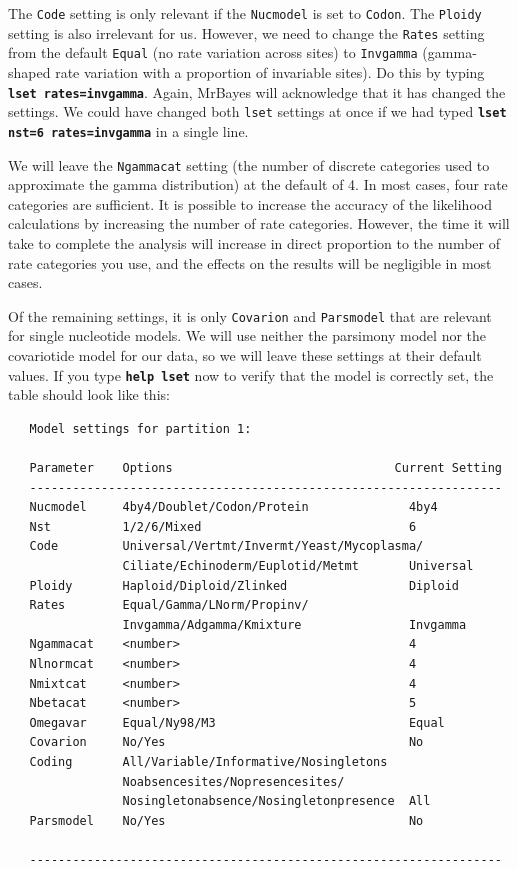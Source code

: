\documentclass[12pt]{book}
\newcommand{\ttt}[1]{\texttt{#1}}
\newcommand{\tb}[1]{\ttt{\textbf{#1}}}
\begin{document}
The \ttt{Code} setting is only relevant if the \ttt{Nucmodel} is set to \ttt{Codon}. The
\ttt{Ploidy} setting is also irrelevant for us. However, we need to change the \ttt{Rates} setting
from the default \ttt{Equal} (no rate variation across sites) to \ttt{Invgamma} (gamma-shaped rate
variation with a proportion of invariable sites). Do this by typing \tb{lset rates=invgamma}.
Again, MrBayes will acknowledge that it has changed the settings. We could have changed both
\ttt{lset} settings at once if we had typed \tb{lset nst=6 rates=invgamma} in a single line.

We will leave the \ttt{Ngammacat} setting (the number of discrete categories used to approximate
the gamma distribution) at the default of 4. In most cases, four rate categories are sufficient. It
is possible to increase the accuracy of the likelihood calculations by increasing the number of
rate categories. However, the time it will take to complete the analysis will increase in direct
proportion to the number of rate categories you use, and the effects on the results will be
negligible in most cases.

Of the remaining settings, it is only \ttt{Covarion} and \ttt{Parsmodel} that are relevant for
single nucleotide models. We will use neither the parsimony model nor the covariotide model for our
data, so we will leave these settings at their default values. If you type \tb{help lset} now to
verify that the model is correctly set, the table should look like this:

\begin{singlespacing}
\footnotesize
\begin{verbatim}
   Model settings for partition 1:

   Parameter    Options                               Current Setting
   ------------------------------------------------------------------
   Nucmodel     4by4/Doublet/Codon/Protein              4by4
   Nst          1/2/6/Mixed                             6
   Code         Universal/Vertmt/Invermt/Yeast/Mycoplasma/
                Ciliate/Echinoderm/Euplotid/Metmt       Universal
   Ploidy       Haploid/Diploid/Zlinked                 Diploid
   Rates        Equal/Gamma/LNorm/Propinv/
                Invgamma/Adgamma/Kmixture               Invgamma
   Ngammacat    <number>                                4
   Nlnormcat    <number>                                4
   Nmixtcat     <number>                                4
   Nbetacat     <number>                                5
   Omegavar     Equal/Ny98/M3                           Equal
   Covarion     No/Yes                                  No
   Coding       All/Variable/Informative/Nosingletons
                Noabsencesites/Nopresencesites/
                Nosingletonabsence/Nosingletonpresence  All
   Parsmodel    No/Yes                                  No

   ------------------------------------------------------------------
\end{verbatim}
\normalsize
\end{singlespacing}
\end{document}
